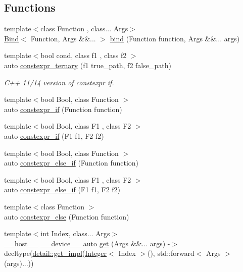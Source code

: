 \subsection*{Functions}
\begin{DoxyCompactItemize}
\item 
{\footnotesize template$<$class Function , class... Args$>$ }\\\hyperlink{structbc_1_1traits_1_1Bind}{Bind}$<$ Function, Args \&\&... $>$ \hyperlink{namespacebc_1_1traits_aec399a77e3255fad556ea6ed08f792d0}{bind} (Function function, Args \&\&... args)
\item 
{\footnotesize template$<$bool cond, class f1 , class f2 $>$ }\\auto \hyperlink{namespacebc_1_1traits_aa4c93747b314d63ac574b3fa27e34eef}{constexpr\+\_\+ternary} (f1 true\+\_\+path, f2 false\+\_\+path)
\begin{DoxyCompactList}\small\item\em C++ 11/14 version of constexpr if. \end{DoxyCompactList}\item 
{\footnotesize template$<$bool Bool, class Function $>$ }\\auto \hyperlink{namespacebc_1_1traits_ab6293ec3371433ca2f273e02f72aa70e}{constexpr\+\_\+if} (Function function)
\item 
{\footnotesize template$<$bool Bool, class F1 , class F2 $>$ }\\auto \hyperlink{namespacebc_1_1traits_a60d74848292fcb1b276f776b66727e92}{constexpr\+\_\+if} (F1 f1, F2 f2)
\item 
{\footnotesize template$<$bool Bool, class Function $>$ }\\auto \hyperlink{namespacebc_1_1traits_a187b6bbba1f4f1c91daf80ae5e4f9813}{constexpr\+\_\+else\+\_\+if} (Function function)
\item 
{\footnotesize template$<$bool Bool, class F1 , class F2 $>$ }\\auto \hyperlink{namespacebc_1_1traits_a28fc737e50096740cbbbacb6e45fcb41}{constexpr\+\_\+else\+\_\+if} (F1 f1, F2 f2)
\item 
{\footnotesize template$<$class Function $>$ }\\auto \hyperlink{namespacebc_1_1traits_a30bcb0bd6da49472c9289e6ee043c827}{constexpr\+\_\+else} (Function function)
\item 
{\footnotesize template$<$int Index, class... Args$>$ }\\\+\_\+\+\_\+host\+\_\+\+\_\+ \+\_\+\+\_\+device\+\_\+\+\_\+ auto \hyperlink{namespacebc_1_1traits_a4de446de235c05a01f9143b54df5a136}{get} (Args \&\&... args) -\/$>$ decltype(\hyperlink{namespacebc_1_1traits_1_1detail_a7f1703c90df0f8695969542729765428}{detail\+::get\+\_\+impl}(\hyperlink{structbc_1_1traits_1_1Integer}{Integer}$<$ Index $>$(), std\+::forward$<$ Args $>$(args)...))

\end{DoxyCompactItemize}

